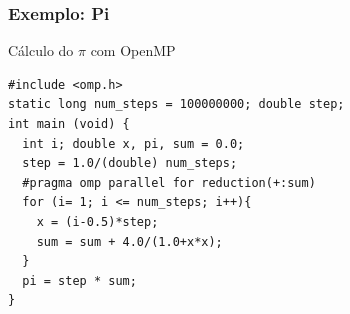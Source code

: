 \documentclass[xcolor={usenames,dvipsnames},12pt,presentation,aspectratio=169]{beamer}
\begin{document}
\begin{frame}[fragile]
  \frametitle{Exemplo: Pi}
Cálculo do $\pi$ com OpenMP
\begin{minipage}{0.95\textwidth}  
\begin{verbatim}   
#include <omp.h>
static long num_steps = 100000000; double step;
int main (void) {
  int i; double x, pi, sum = 0.0;
  step = 1.0/(double) num_steps;
  #pragma omp parallel for reduction(+:sum)
  for (i= 1; i <= num_steps; i++){
    x = (i-0.5)*step;
    sum = sum + 4.0/(1.0+x*x);
  }
  pi = step * sum;
}	  
\end{verbatim}
\end{minipage}
%
%
\end{frame}
\end{document}
